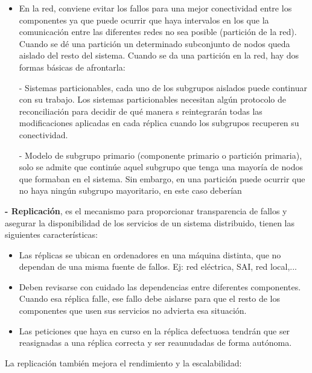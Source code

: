 \documentclass[12pt]{amsart}
\begin{document}
    \begin{itemize}
    
    \item En la red, conviene evitar los fallos para una mejor conectividad entre los componentes ya que puede ocurrir que haya intervalos en los que la comunicación entre las diferentes redes no sea posible (partición de la red). Cuando se dé una partición un determinado subconjunto de nodos queda aislado del resto del sistema. Cuando se da una partición en la red, hay dos formas básicas de afrontarla:
    
    \subitem - Sistemas particionables, cada uno de los subgrupos aislados puede continuar con su trabajo. Los sistemas particionables necesitan algún protocolo de reconciliación para decidir de qué manera s reintegrarán todas las modificaciones aplicadas en cada réplica cuando los subgrupos recuperen su conectividad. 
    
    \subitem - Modelo de subgrupo primario (componente primario o partición primaria), solo se admite que continúe aquel subgrupo que tenga una mayoría de nodos que formaban en el sistema. Sin embargo, en una partición puede ocurrir que no haya ningún subgrupo mayoritario, en este caso deberían 
    
    \end{itemize}
    
    \textbf{- Replicación}, es el mecanismo para proporcionar transparencia de fallos y asegurar la disponibilidad de los servicios de un sistema distribuido, tienen las siguientes características:
    
    \begin{itemize}
        \item Las réplicas se ubican en ordenadores en una máquina distinta, que no dependan de una misma fuente de fallos. Ej: red eléctrica, SAI, red local,...
        \item Deben revisarse con cuidado las dependencias entre diferentes componentes. Cuando esa réplica falle, ese fallo debe aislarse para que el resto de los componentes que usen sus servicios no advierta esa situación.
        \item Las peticiones que haya en curso en la réplica defectuosa tendrán que ser reasignadas a una réplica correcta y ser reaunudadas de forma autónoma.
    \end{itemize}
    La replicación también mejora el rendimiento y la escalabilidad:
    
\end{document}
